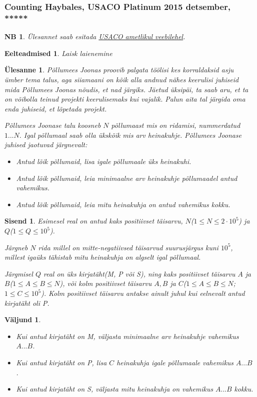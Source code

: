 \documentclass{trkut}
\newtheorem*{prereq}{Eelteadmised}
\newtheorem*{extra}{NB}
\newtheorem*{Input}{Sisend}
\newtheorem*{Output}{Väljund}
\newtheorem*{Text}{Ülesanne}
\begin{document}
\subsubsection{Counting Haybales, USACO Platinum 2015 detsember, *****}
\begin{extra}
Ülesannet saab esitada \href{http://www.usaco.org/index.php?page=viewproblem2&cpid=578}{USACO ametlikul veebilehel}.
\end{extra}
\begin{prereq}
Laisk laienemine
\end{prereq}
\begin{Text}
Põllumees Joonas proovib palgata töölisi kes korraldaksid asju ümber tema talus, aga siiamaani on kõik alla andnud nähes keerulisi juhiseid mida Põllumees Joonas nõudis, et nad järgiks. Jäetud üksipäi, ta saab aru, et ta on võibolla teinud projekti keerulisemaks kui vajalik. Palun aita tal järgida oma enda juhiseid, et lõpetada projekt.

Põllumees Joonase talu koosneb $N$ põllumaast mis on ridamisi, nummerdatud $1...N$. Igal põllumaal saab olla ükskõik mis arv heinakuhje.
Põllumees Joonase juhised jaotuvad järgnevalt:
\begin{itemize}
    \item Antud lõik põllumaid, lisa igale põllumaale üks heinakuhi.
    \item Antud lõik põllumaid,  leia minimaalne arv heinakuhje põllumaadel antud vahemikus.
    \item Antud lõik põllumaid,  leia mitu heinakuhja on antud vahemikus kokku.
\end{itemize}

\parencite{11}
\end{Text}
\begin{Input}
Esimesel real on antud kaks positiivset täisarvu, $N$($1\le N\le 2\cdot 10^5$) ja $Q$($1\le Q\le 10^5$).

Järgneb $N$ rida millel on mitte-negatiivsed täisarvud suurusjärgus kuni $10^5$,  millest igaüks tähistab mitu heinakuhja on algselt igal põllumaal.

Järgmisel $Q$ real on üks kirjatäht(M, P või S), ning kaks positiivset täisarvu $A$ ja $B$($1\le A\le B\le N$), või kolm positiivset täisarvu $A, B$ ja $C$($1\le A\le B\le N$; $1\le C\le 10^5$). Kolm positiivset täisarvu antakse ainult juhul kui eelnevalt antud kirjatäht oli P.

\end{Input}
\begin{Output}
\begin{itemize}
    \item Kui antud kirjatäht on M, väljasta minimaalne arv heinakuhje vahemikus $A...B$.
    \item Kui antud kirjatäht on P,  lisa $C$ heinakuhja igale põllumaale vahemikus $A...B$.
    \item Kui antud kirjatäht on S, väljasta mitu heinakuhja on vahemikus $A...B$  kokku.
\end{itemize}
\end{Output}
\end{document}
